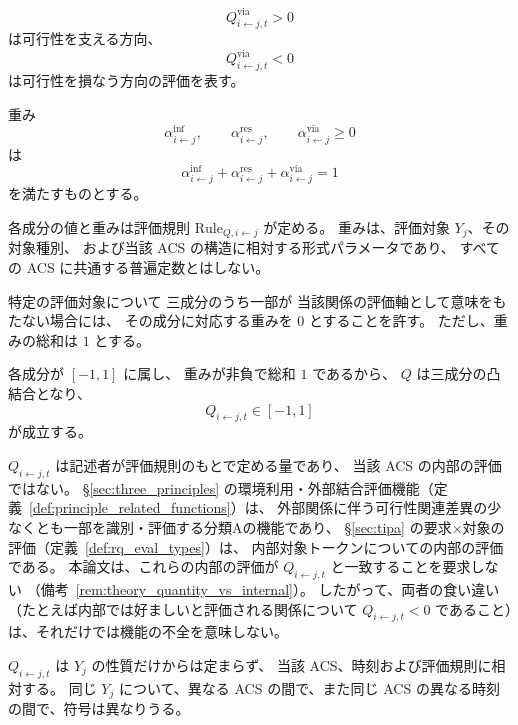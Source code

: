 \begin{definition}[関係品質評価 $Q$]
\begin{itemize}
  \[
    Q^{\mathrm{via}}_{i\leftarrow j,t}>0
  \]
  は可行性を支える方向、
  \[
    Q^{\mathrm{via}}_{i\leftarrow j,t}<0
  \]
  は可行性を損なう方向の評価を表す。
\end{itemize}

重み
\[
  \alpha^{\mathrm{inf}}_{i\leftarrow j},
  \qquad
  \alpha^{\mathrm{res}}_{i\leftarrow j},
  \qquad
  \alpha^{\mathrm{via}}_{i\leftarrow j}
  \ge0
\]
は
\[
  \alpha^{\mathrm{inf}}_{i\leftarrow j}
  +
  \alpha^{\mathrm{res}}_{i\leftarrow j}
  +
  \alpha^{\mathrm{via}}_{i\leftarrow j}
  =1
\]
を満たすものとする。

各成分の値と重みは評価規則 $\mathrm{Rule}_{Q,i\leftarrow j}$ が定める。
重みは、評価対象 $Y_j$、その対象種別、
および当該 ACS の構造に相対する形式パラメータであり、
すべての ACS に共通する普遍定数とはしない。

特定の評価対象について
三成分のうち一部が
当該関係の評価軸として意味をもたない場合には、
その成分に対応する重みを $0$ とすることを許す。
ただし、重みの総和は $1$ とする。

各成分が $[-1,1]$ に属し、
重みが非負で総和 $1$ であるから、
$Q$ は三成分の凸結合となり、
\[
  Q_{i\leftarrow j,t}\in[-1,1]
\]
が成立する。
\end{definition}

\begin{remark}[関係品質と内部の評価の区別]
\label{rem:Q_internal_formal}
$Q_{i\leftarrow j,t}$ は記述者が評価規則のもとで定める量であり、
当該 ACS の内部の評価ではない。
\S\ref{sec:three_principles} の環境利用・外部結合評価機能（定義~\ref{def:principle_related_functions}）は、
外部関係に伴う可行性関連差異の少なくとも一部を識別・評価する分類Aの機能であり、
\S\ref{sec:tipa} の要求×対象の評価（定義~\ref{def:rq_eval_types}）は、
内部対象トークンについての内部の評価である。
本論文は、これらの内部の評価が $Q_{i\leftarrow j,t}$ と一致することを要求しない
（備考~\ref{rem:theory_quantity_vs_internal}）。
したがって、両者の食い違い（たとえば内部では好ましいと評価される関係について
$Q_{i\leftarrow j,t}<0$ であること）は、それだけでは機能の不全を意味しない。
\end{remark}

\begin{remark}[関係品質と対象の性質の区別]
\label{rem:Q_not_property}
$Q_{i\leftarrow j,t}$ は $Y_j$ の性質だけからは定まらず、
当該 ACS、時刻および評価規則に相対する。
同じ $Y_j$ について、異なる ACS の間で、また同じ ACS の異なる時刻の間で、符号は異なりうる。
\end{remark}

